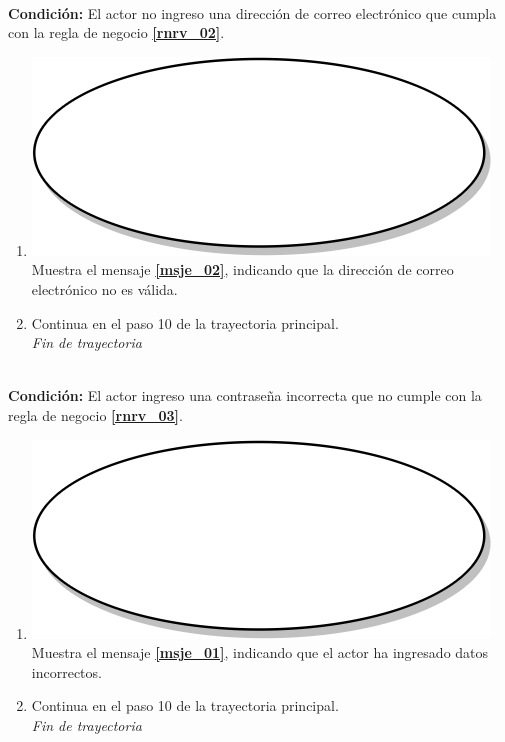 \textbf{} \\
\textbf{Condición:} El actor no ingreso una dirección de correo electrónico que cumpla con la regla de negocio \textbf{\ref{rnrv_02}}.\\
 \begin{enumerate}[label=B\arabic*]
    \item {\includegraphics[scale=.05]{Capitulo3/img/proceso.png} Muestra el mensaje \textbf{\ref{msje_02}}, indicando que la dirección de correo electrónico no es válida.}
    \item {Continua en el paso 10 de la trayectoria principal.} \\
    \textit{Fin de trayectoria} \\
\end{enumerate}

\textbf{} \\
\textbf{Condición:} El actor ingreso una contraseña incorrecta que no cumple con la regla de negocio \textbf{\ref{rnrv_03}}.\\
 \begin{enumerate}[label=C\arabic*]
    \item {\includegraphics[scale=.05]{Capitulo3/img/proceso.png} Muestra el mensaje \textbf{\ref{msje_01}}, indicando que el actor ha ingresado datos incorrectos.}
    \item {Continua en el paso 10 de la trayectoria principal.} \\
    \textit{Fin de trayectoria} \\
\end{enumerate}

